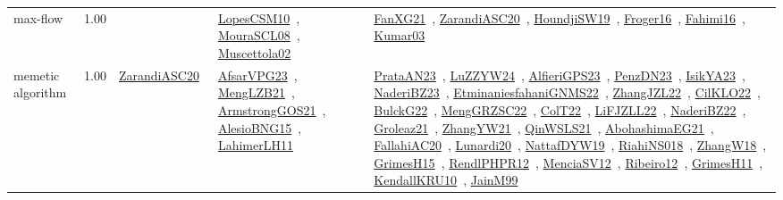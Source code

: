 {\begin{longtable}{p{3cm}r>{\raggedright\arraybackslash}p{6cm}>{\raggedright\arraybackslash}p{6cm}>{\raggedright\arraybackslash}p{8cm}}
\index{max-flow}\index{Algorithms!max-flow}max-flow &  1.00 &  & \href{../works/LopesCSM10.pdf}{LopesCSM10}~\cite{LopesCSM10}, \href{../works/MouraSCL08.pdf}{MouraSCL08}~\cite{MouraSCL08}, \href{../works/Muscettola02.pdf}{Muscettola02}~\cite{Muscettola02} & \href{../works/FanXG21.pdf}{FanXG21}~\cite{FanXG21}, \href{../works/ZarandiASC20.pdf}{ZarandiASC20}~\cite{ZarandiASC20}, \href{../works/HoundjiSW19.pdf}{HoundjiSW19}~\cite{HoundjiSW19}, \href{../works/Froger16.pdf}{Froger16}~\cite{Froger16}, \href{../works/Fahimi16.pdf}{Fahimi16}~\cite{Fahimi16}, \href{../works/Kumar03.pdf}{Kumar03}~\cite{Kumar03}\\
\index{memetic algorithm}\index{Algorithms!memetic algorithm}memetic algorithm &  1.00 & \href{../works/ZarandiASC20.pdf}{ZarandiASC20}~\cite{ZarandiASC20} & \href{../works/AfsarVPG23.pdf}{AfsarVPG23}~\cite{AfsarVPG23}, \href{../works/MengLZB21.pdf}{MengLZB21}~\cite{MengLZB21}, \href{../works/ArmstrongGOS21.pdf}{ArmstrongGOS21}~\cite{ArmstrongGOS21}, \href{../works/AlesioBNG15.pdf}{AlesioBNG15}~\cite{AlesioBNG15}, \href{../works/LahimerLH11.pdf}{LahimerLH11}~\cite{LahimerLH11} & \href{../works/PrataAN23.pdf}{PrataAN23}~\cite{PrataAN23}, \href{../works/LuZZYW24.pdf}{LuZZYW24}~\cite{LuZZYW24}, \href{../works/AlfieriGPS23.pdf}{AlfieriGPS23}~\cite{AlfieriGPS23}, \href{../works/PenzDN23.pdf}{PenzDN23}~\cite{PenzDN23}, \href{../works/IsikYA23.pdf}{IsikYA23}~\cite{IsikYA23}, \href{../works/NaderiBZ23.pdf}{NaderiBZ23}~\cite{NaderiBZ23}, \href{../works/EtminaniesfahaniGNMS22.pdf}{EtminaniesfahaniGNMS22}~\cite{EtminaniesfahaniGNMS22}, \href{../works/ZhangJZL22.pdf}{ZhangJZL22}~\cite{ZhangJZL22}, \href{../works/CilKLO22.pdf}{CilKLO22}~\cite{CilKLO22}, \href{../works/BulckG22.pdf}{BulckG22}~\cite{BulckG22}, \href{../works/MengGRZSC22.pdf}{MengGRZSC22}~\cite{MengGRZSC22}, \href{../works/ColT22.pdf}{ColT22}~\cite{ColT22}, \href{../works/LiFJZLL22.pdf}{LiFJZLL22}~\cite{LiFJZLL22}, \href{../works/NaderiBZ22.pdf}{NaderiBZ22}~\cite{NaderiBZ22}, \href{../works/Groleaz21.pdf}{Groleaz21}~\cite{Groleaz21}, \href{../works/ZhangYW21.pdf}{ZhangYW21}~\cite{ZhangYW21}, \href{../works/QinWSLS21.pdf}{QinWSLS21}~\cite{QinWSLS21}, \href{../works/AbohashimaEG21.pdf}{AbohashimaEG21}~\cite{AbohashimaEG21}, \href{../works/FallahiAC20.pdf}{FallahiAC20}~\cite{FallahiAC20}, \href{../works/Lunardi20.pdf}{Lunardi20}~\cite{Lunardi20}, \href{../works/NattafDYW19.pdf}{NattafDYW19}~\cite{NattafDYW19}, \href{../works/RiahiNS018.pdf}{RiahiNS018}~\cite{RiahiNS018}, \href{../works/ZhangW18.pdf}{ZhangW18}~\cite{ZhangW18}, \href{../works/GrimesH15.pdf}{GrimesH15}~\cite{GrimesH15}, \href{../works/RendlPHPR12.pdf}{RendlPHPR12}~\cite{RendlPHPR12}, \href{../works/MenciaSV12.pdf}{MenciaSV12}~\cite{MenciaSV12}, \href{../works/Ribeiro12.pdf}{Ribeiro12}~\cite{Ribeiro12}, \href{../works/GrimesH11.pdf}{GrimesH11}~\cite{GrimesH11}, \href{../works/KendallKRU10.pdf}{KendallKRU10}~\cite{KendallKRU10}, \href{../works/JainM99.pdf}{JainM99}~\cite{JainM99}\\

\end{longtable}}
